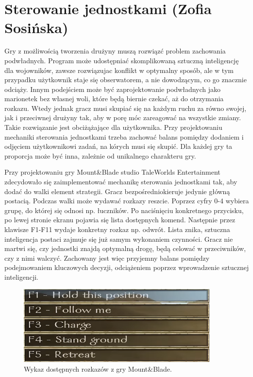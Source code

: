 \section{Sterowanie jednostkami (Zofia Sosińska)}\label{chap:mb}
Gry z możliwością tworzenia drużyny muszą rozwiązć problem zachowania podwładnych. Program może udostępniać
skomplikowaną sztuczną inteligencję dla wojowników, zawsze rozwiązujac konflikt w optymalny sposób, ale w tym przypadku 
użytkownik staje się obserwatorem, a nie dowodzącym, co go znacznie odciąży. Innym podejściem może być zaprojektowanie podwładnych jako 
marionetek bez własnej woli, które będą biernie czekać, aż do otrzymania rozkazu. Wtedy jednak gracz musi skupiać się na 
każdym ruchu za równo swojej, jak i przeciwnej drużyny tak, aby w porę móc zareagować na wszystkie zmiany. Takie rozwiązanie 
jest obciżążające dla użytkownika. Przy projektowaniu mechaniki sterowania jednostkami trzeba zachować balans pomiędzy 
dodaniem i odjęciem użytkownikowi zadań, na kórych musi się skupić. Dla każdej gry ta proporcja może być inna, zależnie
od unikalnego charakteru gry.

Przy projektowaniu gry Mount\&Blade studio TaleWorlds Entertainment zdecydowało się zaimplementować mechanikę sterowania jednostkami tak, aby 
dodać do walki element strategii. Gracz bezpośredniokieruje jedynie główną postacią. Podczas walki może wydawać rozkazy reszcie. Poprzez
cyfry 0-4 wybiera grupę, do której się odnosi np. łuczników. Po naciśnięciu konkretnego przycisku, po lewej stronie ekranu pojawia się lista dostępnych komend.
Następnie przez klawisze F1-F11 wydaje konkretny rozkaz np. odwrót. Lista znika, sztuczna inteligencja postaci zajmuje się już samym wykonaniem czynności. 
Gracz nie martwi się, czy jednostki znajdą optymalną drogę, 
będą celować w przeciwników, czy z nimi walczyć. Zachowany jest więc przyjemny balans pomiędzy podejmowaniem kluczowych decyzji,
odciążeniem poprzez wprowadzenie sztucznej inteligencji.

\begin{figure}[h!tbp]
    \centering
    \includegraphics[width=0.9\textwidth]{images/ui/commandsMountBla.png}
    \caption{Wykaz dostępnych rozkazów z gry Mount\&Blade.}\label{fig:MountnBlade}
    \label{fig:mnb}
\end{figure}
